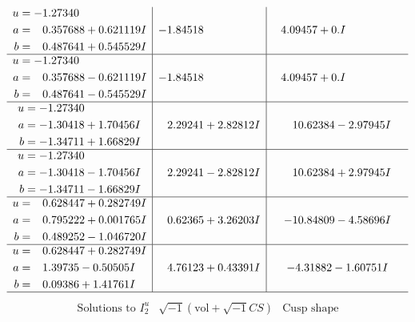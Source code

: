 \documentclass[1p]{elsarticle_modified}
\theoremstyle{definition}
\newcommand{\I}{\sqrt{-1}}
\begin{document}
$$\begin{array}{c|c|c}
\begin{aligned}
u &= -1.27340\phantom{ +0.000000I} \\
a &= \phantom{-}0.357688 + 0.621119 I \\
b &= \phantom{-}0.487641 + 0.545529 I\end{aligned}
 & -1.84518\phantom{ +0.000000I} & \phantom{-}4.09457 + 0. I\phantom{ +0.000000I} \\ \hline\begin{aligned}
u &= -1.27340\phantom{ +0.000000I} \\
a &= \phantom{-}0.357688 - 0.621119 I \\
b &= \phantom{-}0.487641 - 0.545529 I\end{aligned}
 & -1.84518\phantom{ +0.000000I} & \phantom{-}4.09457 + 0. I\phantom{ +0.000000I} \\ \hline\begin{aligned}
u &= -1.27340\phantom{ +0.000000I} \\
a &= -1.30418 + 1.70456 I \\
b &= -1.34711 + 1.66829 I\end{aligned}
 & \phantom{-}2.29241 + 2.82812 I & \phantom{-}10.62384 - 2.97945 I \\ \hline\begin{aligned}
u &= -1.27340\phantom{ +0.000000I} \\
a &= -1.30418 - 1.70456 I \\
b &= -1.34711 - 1.66829 I\end{aligned}
 & \phantom{-}2.29241 - 2.82812 I & \phantom{-}10.62384 + 2.97945 I \\ \hline\begin{aligned}
u &= \phantom{-}0.628447 + 0.282749 I \\
a &= \phantom{-}0.795222 + 0.001765 I \\
b &= \phantom{-}0.489252 - 1.046720 I\end{aligned}
 & \phantom{-}0.62365 + 3.26203 I & -10.84809 - 4.58696 I \\ \hline\begin{aligned}
u &= \phantom{-}0.628447 + 0.282749 I \\
a &= \phantom{-}1.39735 - 0.50505 I \\
b &= \phantom{-}0.09386 + 1.41761 I\end{aligned}
 & \phantom{-}4.76123 + 0.43391 I & -4.31882 - 1.60751 I\\
 \hline 
 \end{array}$$\newpage$$\begin{array}{c|c|c}  
\text{Solutions to }I^u_{2}& \I (\text{vol} + \sqrt{-1}CS) & \text{Cusp shape}\\

\end{array}$$
\end{document}
